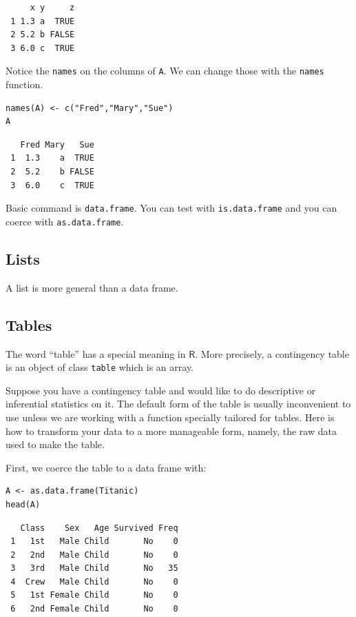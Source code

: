 \documentclass[captions=tableheading]{scrbook}
\begin{document}
\begin{example}
\begin{verbatim}
     x y     z
 1 1.3 a  TRUE
 2 5.2 b FALSE
 3 6.0 c  TRUE
\end{verbatim}

Notice the \texttt{names} on the columns of \texttt{A}. We can change those with the \texttt{names} function.


\begin{verbatim}
names(A) <- c("Fred","Mary","Sue")
A
\end{verbatim}

\begin{verbatim}
   Fred Mary   Sue
 1  1.3    a  TRUE
 2  5.2    b FALSE
 3  6.0    c  TRUE
\end{verbatim}

Basic command is \texttt{data.frame}. You can test with \texttt{is.data.frame} and you can coerce with \texttt{as.data.frame}.
\subsection{Lists}
\label{sec-20-1-4}

A list is more general than a data frame.
\subsection{Tables}
\label{sec-20-1-5}

The word ``table'' has a special meaning in \(\mathsf{R}\). More precisely, a contingency table is an object of class \texttt{table} which is an array.

Suppose you have a contingency table and would like to do descriptive or inferential statistics on it. The default form of the table is usually inconvenient to use unless we are working with a function specially tailored for tables. Here is how to transform your data to a more manageable form, namely, the raw data used to make the table.

First, we coerce the table to a data frame with: 


\begin{verbatim}
A <- as.data.frame(Titanic)
head(A)
\end{verbatim}

\begin{verbatim}
   Class    Sex   Age Survived Freq
 1   1st   Male Child       No    0
 2   2nd   Male Child       No    0
 3   3rd   Male Child       No   35
 4  Crew   Male Child       No    0
 5   1st Female Child       No    0
 6   2nd Female Child       No    0
\end{verbatim}


\end{example}
\end{document}
